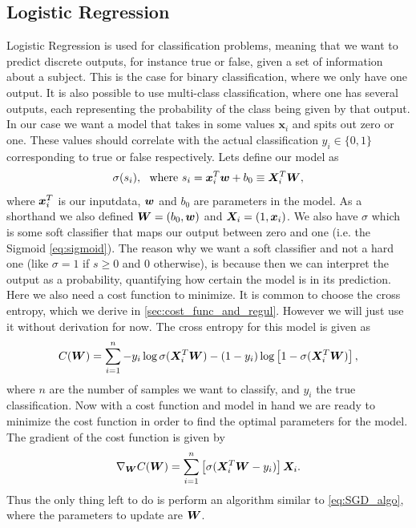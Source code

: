 \documentclass[12pt]{extarticle}
\begin{document}
\subsection{Logistic Regression}\label{sec:logistic_regression}
Logistic Regression is used for classification problems, meaning that we want to predict discrete outputs, for instance true or false, given a set of information about a subject. This is the case for binary classification, where we only have one output. It is also possible to use multi-class classification, where one has several outputs, each representing the probability of the class being given by that output. In our case we want a model that takes in some values $\mathbf{x}_i$ and spits out zero or one. These values should correlate with the actual classification $y_i\in\{0,1\}$ corresponding to true or false respectively. Lets define our model as
\begin{align}
	\sigma(s_i), \ \ \text{where }s_i = \boldsymbol x_i^T \boldsymbol w + b_0 \equiv \boldsymbol X_i^T \boldsymbol W,
	\label{eq:log_reg_model}
\end{align}
where $\boldsymbol x_i^T$ is our inputdata, $\boldsymbol w$ and $b_0$ are parameters in the model. As a shorthand we also defined $\boldsymbol W = (b_0, \boldsymbol w)$ and $\boldsymbol X_i = (1, \boldsymbol x_i)$. We also have $\sigma$ which is some soft classifier that maps our output between zero and one (i.e. the Sigmoid \eqref{eq:sigmoid}). The reason why we want a soft classifier and not a hard one (like $\sigma = 1$ if $s\geq0$ and $0$ otherwise), is because then we can interpret the output as a probability, quantifying how certain the model is in its prediction. Here we also need a cost function to minimize. It is common to choose the cross entropy, which we derive in \ref{sec:cost_func_and_regul}. However we will just use it without derivation for now. The cross entropy for this model is given as
\begin{align}
	C(\boldsymbol W) = \sum_{i = 1}^{n} -y_i \log\sigma(\boldsymbol X_i^T \boldsymbol W) - (1 - y_i)\log\left[1 - \sigma(\boldsymbol X^T_i \boldsymbol W)\right],
	\label{eq:cross_entropy2}
\end{align}
where $n$ are the number of samples we want to classify, and $y_i$ the true classification. Now with a cost function and model in hand we are ready to minimize the cost function in order to find the optimal parameters for the model. The gradient of the cost function is given by
\begin{align}
	\nabla_{\boldsymbol W} C(\boldsymbol W) = \sum_{i = 1}^n \left[\sigma(\boldsymbol X_i^T \boldsymbol W - y_i)\right]\boldsymbol X_i.
	\label{eq:cross_entropy_grad}
\end{align}
Thus the only thing left to do is perform an algorithm similar to \ref{eq:SGD_algo}, where the parameters to update are $\boldsymbol W$.
\end{document}
